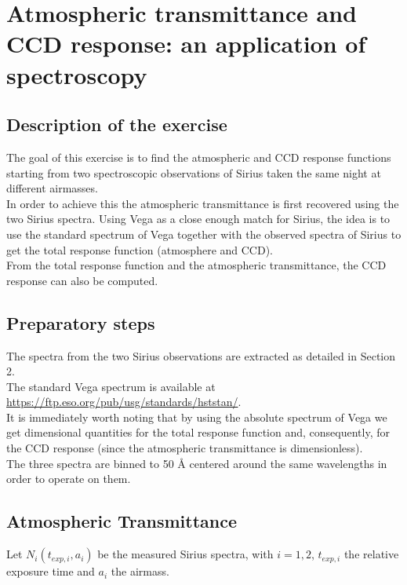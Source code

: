 \documentclass[a4paper]{article}
\begin{document}
	\vspace{0.035\textheight}

	\section{Atmospheric transmittance and CCD response: an application of spectroscopy}
	\begin{multicols}{2}
		\subsection{Description of the exercise}
			The goal of this exercise is to find the atmospheric and CCD response functions starting from two spectroscopic observations of Sirius taken the same night at different airmasses.\\
			In order to achieve this the atmospheric transmittance is first recovered using the two Sirius spectra. Using Vega as a close enough match for Sirius, the idea is to use the standard spectrum of Vega together with the observed spectra of Sirius to get the total response function (atmosphere and CCD).\\
			From the total response function and the atmospheric transmittance, the CCD response can also be computed.\\
			
		\subsection{Preparatory steps}
			The spectra from the two Sirius observations are extracted as detailed in Section 2.\\
			
			The standard Vega spectrum is available at \url{https://ftp.eso.org/pub/usg/standards/hststan/}.\\
			It is immediately worth noting that by using the absolute spectrum of Vega we get dimensional quantities for the total response function and, consequently, for the CCD response (since the atmospheric transmittance is dimensionless).\\
			
			The three spectra are binned to 50 \si{\angstrom} centered around the same wavelengths in order to operate on them.
		
		\subsection{Atmospheric Transmittance}
			Let $N_i(t_{exp,i}, a_i)$ be the measured Sirius spectra, with $i = 1,2$, $t_{exp,i}$ the relative exposure time and $a_i$ the airmass.\\
			

\end{multicols}
\end{document}
